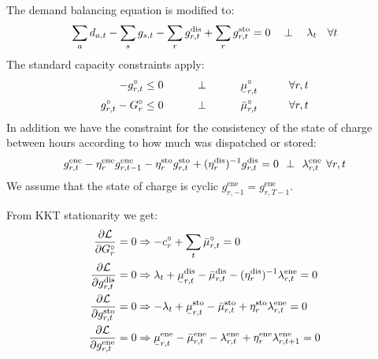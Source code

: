 \documentclass[final,3p]{elsarticle}
\def\l{\lambda} \def\K{\kappa} \def\m{\mu} \def\G{\Gamma} \def\d{\partial}
\def\cL{\mathcal{L}} \newcommand{\ubar}[1]{\text{\b{$#1$}}}
\begin{document}
The demand balancing equation is modified to:
\begin{equation}
  \sum_a d_{a,t} - \sum_s g_{s,t} - \sum_r g^{\textrm{dis}}_{r,t}  + \sum_r g^{\textrm{sto}}_{r,t}  =  0 \hspace{0.34cm}\perp \hspace{0.34cm} \l_t \hspace{0.34cm} \forall t
\end{equation}
The standard capacity constraints apply:
\begin{align}
  -g^\circ_{r,t}\leq 0 \hspace{1cm}\perp \hspace{1cm} \ubar{\mu}^\circ_{r,t} \hspace{1cm} \forall r,t  \label{eq:storlower} \\
  g^\circ_{r,t} - G^\circ_r \leq 0 \hspace{1cm}\perp \hspace{1cm} \bar{\mu}^\circ_{r,t} \hspace{1cm} \forall r,t \label{eq:storupper}
\end{align}
In addition we have the constraint for the consistency of the state of charge
between hours according to how much was dispatched or stored:
\begin{equation}
  g^{\textrm{ene}}_{r,t}- \eta^{\textrm{ene}}_r g^{\textrm{ene}}_{r,t-1} - \eta^{\textrm{sto}}_r g^{\textrm{sto}}_{r,t} + (\eta^{\textrm{dis}}_r)^{-1} g^{\textrm{dis}}_{r,t}  =  0 \hspace{0.14cm}\perp \hspace{0.14cm} \l^{\textrm{ene}}_{r,t} \hspace{0.14cm} \forall r,t  \label{eq:storsoc}
\end{equation}
We assume that the state of charge is cyclic $g^{\textrm{ene}}_{r,-1} =
g^{\textrm{ene}}_{r,T-1}$.

From KKT stationarity we get:
\begin{align}
  \frac{\d \cL}{\d G^\circ_{r}} = 0            & \Rightarrow - c^\circ_r + \sum_t \bar{\m}^\circ_{r,t}  = 0                                                                                                      \\
  \frac{\d \cL}{\d g^{\textrm{dis}}_{r,t}} = 0 & \Rightarrow  \l_t + \ubar{\m}^{\textrm{dis}}_{r,t} - \bar{\m}^{\textrm{dis}}_{r,t} - (\eta^{\textrm{dis}}_r)^{-1} \l^{\textrm{ene}}_{r,t}  = 0                  \\
  \frac{\d \cL}{\d g^{\textrm{sto}}_{r,t}} = 0 & \Rightarrow  -\l_t + \ubar{\m}^{\textrm{sto}}_{r,t} - \bar{\m}^{\textrm{sto}}_{r,t} + \eta^{\textrm{sto}}_r \l^{\textrm{ene}}_{r,t}  = 0                        \\
  \frac{\d \cL}{\d g^{\textrm{ene}}_{r,t}} = 0 & \Rightarrow   \ubar{\m}^{\textrm{ene}}_{r,t} - \bar{\m}^{\textrm{ene}}_{r,t} -  \l^{\textrm{ene}}_{r,t} + \eta^{\textrm{ene}}_r \l^{\textrm{ene}}_{r,t+1}   = 0
\end{align}
\end{document}
